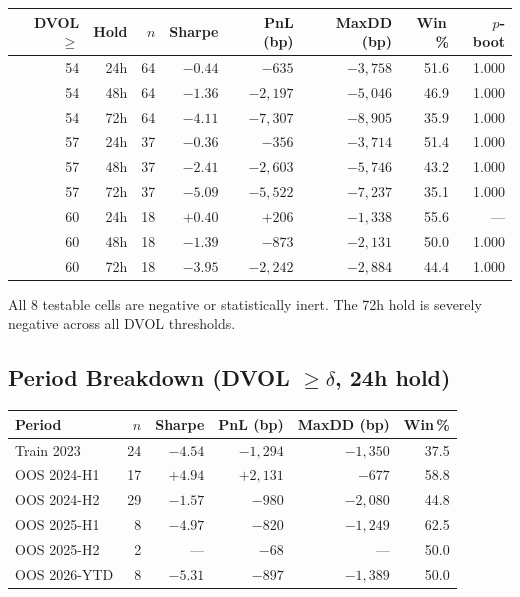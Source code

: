 \documentclass[12pt, a4paper]{article}
\theoremstyle{plain}
\theoremstyle{definition}
\begin{document}
\begin{center}
\begin{tabular}{rrrrrrrr}
\toprule
DVOL $\geq$ & Hold & $n$ & Sharpe & PnL (bp) & MaxDD (bp) & Win\,\% & $p$-boot \\
\midrule
54 & 24h & 64 & $-0.44$ & $-635$   & $-3{,}758$ & 51.6 & 1.000 \\
54 & 48h & 64 & $-1.36$ & $-2{,}197$ & $-5{,}046$ & 46.9 & 1.000 \\
54 & 72h & 64 & $-4.11$ & $-7{,}307$ & $-8{,}905$ & 35.9 & 1.000 \\
\midrule
57 & 24h & 37 & $-0.36$ & $-356$   & $-3{,}714$ & 51.4 & 1.000 \\
57 & 48h & 37 & $-2.41$ & $-2{,}603$ & $-5{,}746$ & 43.2 & 1.000 \\
57 & 72h & 37 & $-5.09$ & $-5{,}522$ & $-7{,}237$ & 35.1 & 1.000 \\
\midrule
60 & 24h & 18 & $+0.40$ & $+206$   & $-1{,}338$ & 55.6 & --- \\
60 & 48h & 18 & $-1.39$ & $-873$   & $-2{,}131$ & 50.0 & 1.000 \\
60 & 72h & 18 & $-3.95$ & $-2{,}242$ & $-2{,}884$ & 44.4 & 1.000 \\
\bottomrule
\end{tabular}
\end{center}

All 8 testable cells are negative or statistically inert.  The 72h hold
is severely negative across all DVOL thresholds.

\subsection{Period Breakdown (DVOL $\geq \delta$, 24h hold)}

\begin{center}
\begin{tabular}{lrrrrr}
\toprule
Period & $n$ & Sharpe & PnL (bp) & MaxDD (bp) & Win\,\% \\
\midrule
Train 2023    & 24 & $-4.54$ & $-1{,}294$ & $-1{,}350$ & 37.5 \\
OOS 2024-H1   & 17 & $+4.94$ & $+2{,}131$ & $-677$     & 58.8 \\
OOS 2024-H2   & 29 & $-1.57$ & $-980$     & $-2{,}080$ & 44.8 \\
OOS 2025-H1   &  8 & $-4.97$ & $-820$     & $-1{,}249$ & 62.5 \\
OOS 2025-H2   &  2 & ---     & $-68$      & ---        & 50.0 \\
OOS 2026-YTD  &  8 & $-5.31$ & $-897$     & $-1{,}389$ & 50.0 \\
\bottomrule
\end{tabular}
\end{center}
\end{document}
